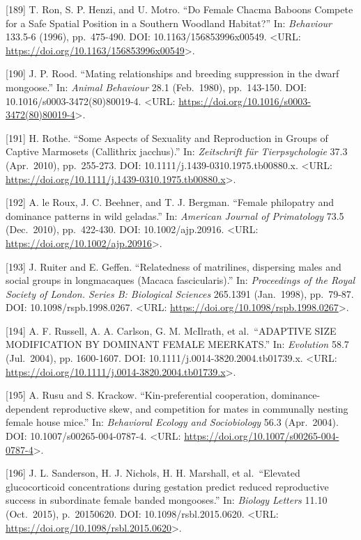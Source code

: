 \documentclass[
]{article}
\begin{document}
{[}189{]} T. Ron, S. P. Henzi, and U. Motro. ``Do Female Chacma Baboons
Compete for a Safe Spatial Position in a Southern Woodland Habitat?''
In: \emph{Behaviour} 133.5-6 (1996), pp.~475-490. DOI:
10.1163/156853996x00549. \textless URL:
\url{https://doi.org/10.1163/156853996x00549}\textgreater.

{[}190{]} J. P. Rood. ``Mating relationships and breeding suppression in
the dwarf mongoose.'' In: \emph{Animal Behaviour} 28.1 (Feb.~1980),
pp.~143-150. DOI: 10.1016/s0003-3472(80)80019-4. \textless URL:
\url{https://doi.org/10.1016/s0003-3472(80)80019-4}\textgreater.

{[}191{]} H. Rothe. ``Some Aspects of Sexuality and Reproduction in
Groups of Captive Marmosets (Callithrix jacchus).'' In:
\emph{Zeitschrift für Tierpsychologie} 37.3 (Apr.~2010), pp.~255-273.
DOI: 10.1111/j.1439-0310.1975.tb00880.x. \textless URL:
\url{https://doi.org/10.1111/j.1439-0310.1975.tb00880.x}\textgreater.

{[}192{]} A. le Roux, J. C. Beehner, and T. J. Bergman. ``Female
philopatry and dominance patterns in wild geladas.'' In: \emph{American
Journal of Primatology} 73.5 (Dec.~2010), pp.~422-430. DOI:
10.1002/ajp.20916. \textless URL:
\url{https://doi.org/10.1002/ajp.20916}\textgreater.

{[}193{]} J. Ruiter and E. Geffen. ``Relatedness of matrilines,
dispersing males and social groups in long\textendashtailed macaques
(Macaca fascicularis).'' In: \emph{Proceedings of the Royal Society of
London. Series B: Biological Sciences} 265.1391 (Jan.~1998), pp.~79-87.
DOI: 10.1098/rspb.1998.0267. \textless URL:
\url{https://doi.org/10.1098/rspb.1998.0267}\textgreater.

{[}194{]} A. F. Russell, A. A. Carlson, G. M. McIlrath, et
al.~``ADAPTIVE SIZE MODIFICATION BY DOMINANT FEMALE MEERKATS.'' In:
\emph{Evolution} 58.7 (Jul.~2004), pp. 1600-1607. DOI:
10.1111/j.0014-3820.2004.tb01739.x. \textless URL:
\url{https://doi.org/10.1111/j.0014-3820.2004.tb01739.x}\textgreater.

{[}195{]} A. Rusu and S. Krackow. ``Kin-preferential cooperation,
dominance-dependent reproductive skew, and competition for mates in
communally nesting female house mice.'' In: \emph{Behavioral Ecology and
Sociobiology} 56.3 (Apr.~2004). DOI: 10.1007/s00265-004-0787-4.
\textless URL:
\url{https://doi.org/10.1007/s00265-004-0787-4}\textgreater.

{[}196{]} J. L. Sanderson, H. J. Nichols, H. H. Marshall, et
al.~``Elevated glucocorticoid concentrations during gestation predict
reduced reproductive success in subordinate female banded mongooses.''
In: \emph{Biology Letters} 11.10 (Oct.~2015), p.~20150620. DOI:
10.1098/rsbl.2015.0620. \textless URL:
\url{https://doi.org/10.1098/rsbl.2015.0620}\textgreater.
\end{document}
